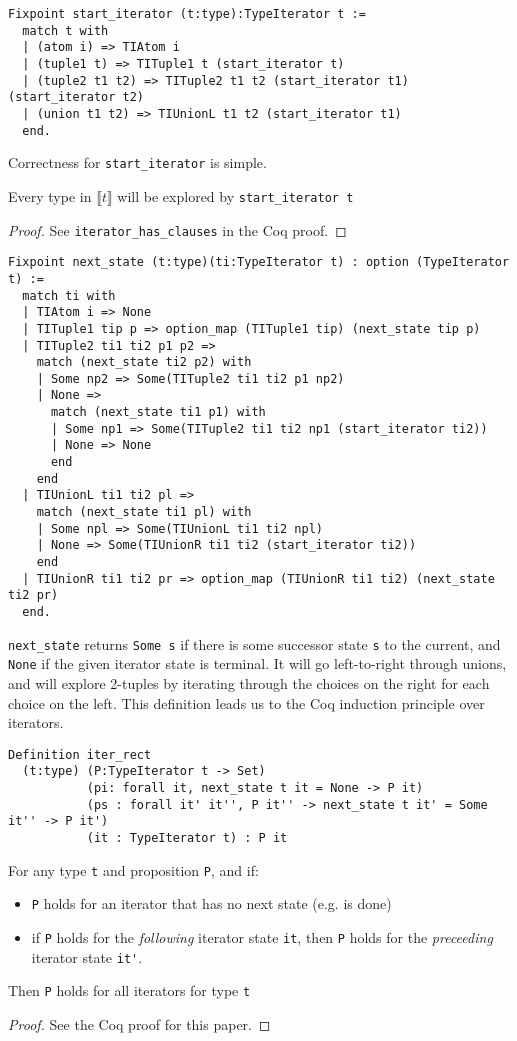 \documentclass[a4paper,UKenglish]{lipics-v2018}
\newcommand{\denotes}[1]{\llbracket #1 \rrbracket}
\begin{document}
\begin{verbatim}
Fixpoint start_iterator (t:type):TypeIterator t :=
  match t with
  | (atom i) => TIAtom i
  | (tuple1 t) => TITuple1 t (start_iterator t)
  | (tuple2 t1 t2) => TITuple2 t1 t2 (start_iterator t1) (start_iterator t2)
  | (union t1 t2) => TIUnionL t1 t2 (start_iterator t1)
  end.
\end{verbatim}

Correctness for \verb|start_iterator| is simple.

\begin{theorem}
Every type in $\denotes{t}$ will be explored by \verb|start_iterator t| 
\end{theorem}
\begin{proof}
See \verb|iterator_has_clauses| in the Coq proof.
\end{proof}

\begin{verbatim}
Fixpoint next_state (t:type)(ti:TypeIterator t) : option (TypeIterator t) :=
  match ti with
  | TIAtom i => None
  | TITuple1 tip p => option_map (TITuple1 tip) (next_state tip p)
  | TITuple2 ti1 ti2 p1 p2 =>
    match (next_state ti2 p2) with
    | Some np2 => Some(TITuple2 ti1 ti2 p1 np2)
    | None =>
      match (next_state ti1 p1) with
      | Some np1 => Some(TITuple2 ti1 ti2 np1 (start_iterator ti2))
      | None => None
      end
    end
  | TIUnionL ti1 ti2 pl =>
    match (next_state ti1 pl) with
    | Some npl => Some(TIUnionL ti1 ti2 npl)
    | None => Some(TIUnionR ti1 ti2 (start_iterator ti2))
    end
  | TIUnionR ti1 ti2 pr => option_map (TIUnionR ti1 ti2) (next_state ti2 pr)
  end.
\end{verbatim}

\verb|next_state| returns \verb|Some s| if there is some successor state
\verb|s| to the current, and \verb|None| if the given iterator state is
terminal. It will go left-to-right through unions, and will explore 2-tuples
by iterating through the choices on the right for each choice on the left.
This definition leads us to the Coq induction principle over iterators.

\begin{theorem}
\begin{verbatim}
Definition iter_rect
  (t:type) (P:TypeIterator t -> Set)
           (pi: forall it, next_state t it = None -> P it)
           (ps : forall it' it'', P it'' -> next_state t it' = Some it'' -> P it')
           (it : TypeIterator t) : P it  
\end{verbatim}

For any type \verb|t| and proposition \verb|P|, and if:
\begin{itemize} 
	\item \verb|P| holds for an iterator that has no next state (e.g. is done)
	\item if \verb|P| holds for the \emph{following} iterator state \verb|it|,
	then \verb|P| holds for the \emph{preceeding} iterator state \verb|it'|.
\end{itemize}
Then \verb|P| holds for all iterators for type \verb|t|
\end{theorem}
\begin{proof}
See the Coq proof for this paper.
\end{proof}
\end{document}
